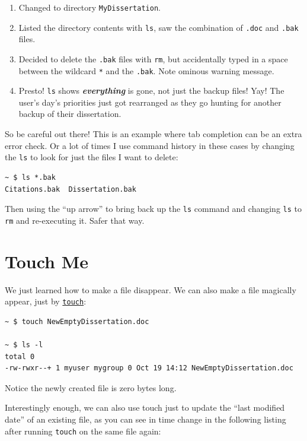 \documentclass[10pt,]{book}
\numberwithin{figure}{chapter}
\begin{document}
\begin{enumerate}
\def\labelenumi{\arabic{enumi}.}
\item
  Changed to directory \texttt{MyDissertation}.
\item
  Listed the directory contents with \texttt{ls}, saw the combination of
  \texttt{.doc} and \texttt{.bak} files.
\item
  Decided to delete the \texttt{.bak} files with \texttt{rm}, but
  accidentally typed in a space between the wildcard \texttt{*} and the
  \texttt{.bak}. Note ominous warning message.
\item
  Presto! \texttt{ls} shows \textbf{\emph{everything}} is gone, not just
  the backup files! Yay! The user's day's priorities just got rearranged
  as they go hunting for another backup of their dissertation.
\end{enumerate}

So be careful out there! This is an example where tab completion can be
an extra error check. Or a lot of times I use command history in these
cases by changing the \texttt{ls} to look for just the files I want to
delete:

\begin{verbatim}
~ $ ls *.bak
Citations.bak  Dissertation.bak
\end{verbatim}

Then using the ``up arrow'' to bring back up the \texttt{ls} command and
changing \texttt{ls} to \texttt{rm} and re-executing it. Safer that way.

\section{Touch Me}\label{touch-me}

We just learned how to make a file disappear. We can also make a file
magically appear, just by
\href{http://linux.die.net/man/1/touch}{\texttt{touch}}:

\begin{verbatim}
~ $ touch NewEmptyDissertation.doc

~ $ ls -l
total 0
-rw-rwxr--+ 1 myuser mygroup 0 Oct 19 14:12 NewEmptyDissertation.doc
\end{verbatim}

Notice the newly created file is zero bytes long.

Interestingly enough, we can also use touch just to update the ``last
modified date'' of an existing file, as you can see in time change in
the following listing after running \texttt{touch} on the same file
again:
\end{document}

